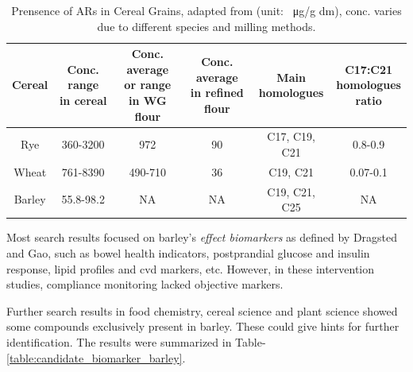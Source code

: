 \begin{table}[h!]
		\footnotesize
\centering
\begin{tabular}{|c|c|c|c|c|c|}
	\hline 
	Cereal & \makecell{Conc. range \\in cereal}& \makecell{Conc. average \\or range \\in WG flour }& \makecell{Conc. average \\in refined \\flour} & \makecell{Main\\homologues} & \makecell{C17:C21\\ homologues\\ratio} \\ 
	\hline 
	Rye&360-3200& 972 &90&C17, C19, C21& 0.8-0.9 \\ 
	\hline 
	Wheat&761-8390& 490-710 & 36& C19, C21& 0.07-0.1 \\ 
	\hline 
	Barley& 55.8-98.2&NA & NA& C19, C21, C25&NA  \\ 
	\hline 
\end{tabular} 
	\caption{Prensence of ARs in Cereal Grains, adapted from \cite{doi:10.1021/jf0340456,ANDERSSON2010794,BORDIGA201638}(unit: \SI{}{\micro\gram}/g dm), conc. varies due to different species and milling methods.}
	\label{table:ars_in_plant}
\end{table}

Most search results focused on barley's \textit{effect biomarkers} as defined by Dragsted\cite{Dragsted2017} and Gao\cite{Gao2017}, such as bowel health indicators\cite{Bird2008}, postprandial glucose and insulin response\cite{Ames2015}, lipid profiles and \acrfull{cvd} markers\cite{Marungruang2018}, etc. However, in these intervention studies, compliance monitoring lacked objective markers.

Further search results in food chemistry, cereal science and plant science showed some compounds exclusively present in barley. These could give hints for further identification. The results were summarized in Table-\ref{table:candidate_biomarker_barley}.

